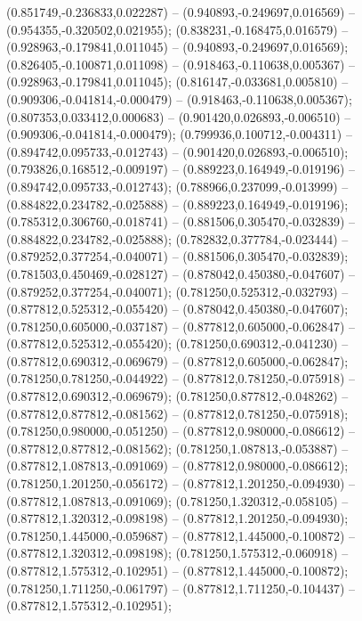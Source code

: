  (0.851749,-0.236833,0.022287) -- (0.940893,-0.249697,0.016569) -- (0.954355,-0.320502,0.021955);
 (0.838231,-0.168475,0.016579) -- (0.928963,-0.179841,0.011045) -- (0.940893,-0.249697,0.016569);
 (0.826405,-0.100871,0.011098) -- (0.918463,-0.110638,0.005367) -- (0.928963,-0.179841,0.011045);
 (0.816147,-0.033681,0.005810) -- (0.909306,-0.041814,-0.000479) -- (0.918463,-0.110638,0.005367);
 (0.807353,0.033412,0.000683) -- (0.901420,0.026893,-0.006510) -- (0.909306,-0.041814,-0.000479);
 (0.799936,0.100712,-0.004311) -- (0.894742,0.095733,-0.012743) -- (0.901420,0.026893,-0.006510);
 (0.793826,0.168512,-0.009197) -- (0.889223,0.164949,-0.019196) -- (0.894742,0.095733,-0.012743);
 (0.788966,0.237099,-0.013999) -- (0.884822,0.234782,-0.025888) -- (0.889223,0.164949,-0.019196);
 (0.785312,0.306760,-0.018741) -- (0.881506,0.305470,-0.032839) -- (0.884822,0.234782,-0.025888);
 (0.782832,0.377784,-0.023444) -- (0.879252,0.377254,-0.040071) -- (0.881506,0.305470,-0.032839);
 (0.781503,0.450469,-0.028127) -- (0.878042,0.450380,-0.047607) -- (0.879252,0.377254,-0.040071);
 (0.781250,0.525312,-0.032793) -- (0.877812,0.525312,-0.055420) -- (0.878042,0.450380,-0.047607);
 (0.781250,0.605000,-0.037187) -- (0.877812,0.605000,-0.062847) -- (0.877812,0.525312,-0.055420);
 (0.781250,0.690312,-0.041230) -- (0.877812,0.690312,-0.069679) -- (0.877812,0.605000,-0.062847);
 (0.781250,0.781250,-0.044922) -- (0.877812,0.781250,-0.075918) -- (0.877812,0.690312,-0.069679);
 (0.781250,0.877812,-0.048262) -- (0.877812,0.877812,-0.081562) -- (0.877812,0.781250,-0.075918);
 (0.781250,0.980000,-0.051250) -- (0.877812,0.980000,-0.086612) -- (0.877812,0.877812,-0.081562);
 (0.781250,1.087813,-0.053887) -- (0.877812,1.087813,-0.091069) -- (0.877812,0.980000,-0.086612);
 (0.781250,1.201250,-0.056172) -- (0.877812,1.201250,-0.094930) -- (0.877812,1.087813,-0.091069);
 (0.781250,1.320312,-0.058105) -- (0.877812,1.320312,-0.098198) -- (0.877812,1.201250,-0.094930);
 (0.781250,1.445000,-0.059687) -- (0.877812,1.445000,-0.100872) -- (0.877812,1.320312,-0.098198);
 (0.781250,1.575312,-0.060918) -- (0.877812,1.575312,-0.102951) -- (0.877812,1.445000,-0.100872);
 (0.781250,1.711250,-0.061797) -- (0.877812,1.711250,-0.104437) -- (0.877812,1.575312,-0.102951);
